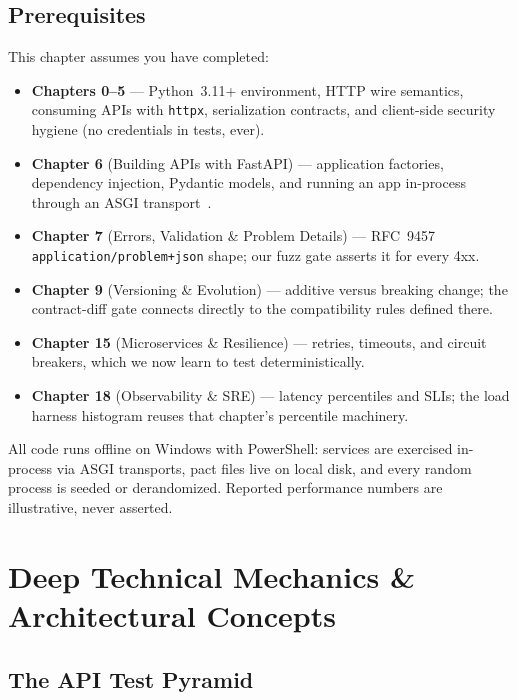 \subsection*{Prerequisites}
This chapter assumes you have completed:

\begin{itemize}
  \item \textbf{Chapters 0--5} --- Python~3.11+ environment, HTTP wire
        semantics, consuming APIs with \texttt{httpx}, serialization
        contracts, and client-side security hygiene (no credentials in
        tests, ever).
  \item \textbf{Chapter 6} (Building APIs with FastAPI) --- application
        factories, dependency injection, Pydantic models, and running an
        app in-process through an ASGI transport~\cite{fastapidocs}.
  \item \textbf{Chapter 7} (Errors, Validation \& Problem Details) ---
        RFC~9457 \texttt{application/problem+json} shape; our fuzz gate
        asserts it for every 4xx.
  \item \textbf{Chapter 9} (Versioning \& Evolution) --- additive versus
        breaking change; the contract-diff gate connects directly to the
        compatibility rules defined there.
  \item \textbf{Chapter 15} (Microservices \& Resilience) --- retries,
        timeouts, and circuit breakers, which we now learn to test
        deterministically.
  \item \textbf{Chapter 18} (Observability \& SRE) --- latency percentiles
        and SLIs; the load harness histogram reuses that chapter's
        percentile machinery.
\end{itemize}

All code runs offline on Windows with PowerShell: services are exercised
in-process via ASGI transports, pact files live on local disk, and every
random process is seeded or derandomized. Reported performance numbers are
illustrative, never asserted.

\section{Deep Technical Mechanics \& Architectural Concepts}
\label{sec:ch19-mechanics}

\subsection{The API Test Pyramid}
\label{sec:ch19-pyramid}

